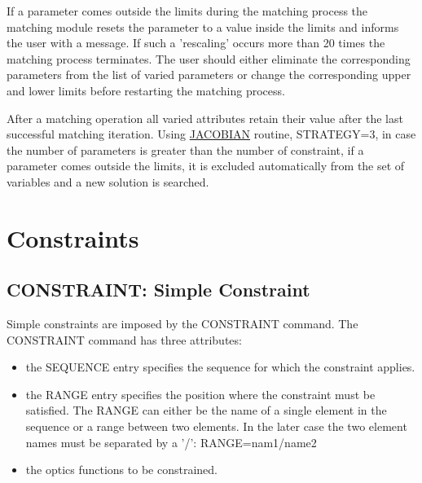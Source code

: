 If a parameter comes outside the
limits during the matching process the matching module resets the
parameter to a value inside the limits and informs the user with a
message. If such a 'rescaling' occurs more than 20 times the matching
process terminates. The user should either eliminate the corresponding
parameters from the list of varied parameters or change the
corresponding upper and lower limits before restarting the matching
process. 

After a matching operation all varied attributes retain their
value after the last successful matching iteration. Using
\href{match_xeq.html#jacobian}{JACOBIAN} routine, STRATEGY=3, in case
the number of parameters is greater than the number of constraint, if a
parameter comes outside the limits, it is excluded automatically from
the set of variables and a new solution is searched.  




%
\section{Constraints}

\subsection{CONSTRAINT: Simple Constraint}
\label{subsec:match_con}

Simple constraints are imposed by the CONSTRAINT command. The CONSTRAINT
command has three attributes:   
\begin{itemize}
	\item  the SEQUENCE entry specifies the sequence for which the
          constraint applies.  
	\item  the RANGE entry specifies the position where the
          constraint must be satisfied. The RANGE can either be the name
          of a single element in the sequence or a range between two
          elements. In the later case the two element names must be
          separated by a '/': RANGE=nam1/name2  
	\item the optics functions to be constrained. 
\end{itemize} 

